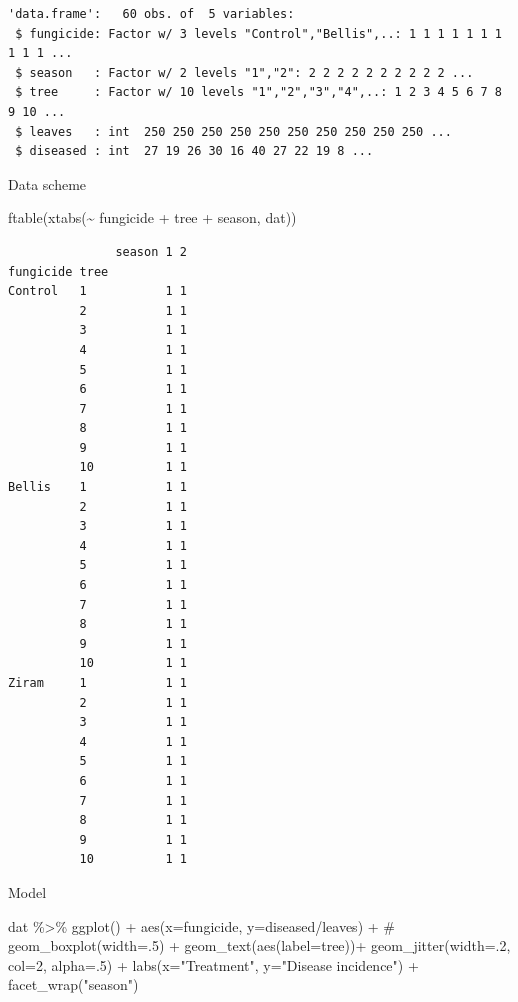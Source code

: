 \documentclass[
  letterpaper,
  DIV=11,
  numbers=noendperiod]{scrartcl}
\newenvironment{Shaded}{\begin{snugshade}}{\end{snugshade}}
\newcommand{\AttributeTok}[1]{\textcolor[rgb]{0.40,0.45,0.13}{#1}}
\newcommand{\CommentTok}[1]{\textcolor[rgb]{0.37,0.37,0.37}{#1}}
\newcommand{\DecValTok}[1]{\textcolor[rgb]{0.68,0.00,0.00}{#1}}
\newcommand{\FunctionTok}[1]{\textcolor[rgb]{0.28,0.35,0.67}{#1}}
\newcommand{\NormalTok}[1]{\textcolor[rgb]{0.00,0.23,0.31}{#1}}
\newcommand{\SpecialCharTok}[1]{\textcolor[rgb]{0.37,0.37,0.37}{#1}}
\newcommand{\StringTok}[1]{\textcolor[rgb]{0.13,0.47,0.30}{#1}}
\begin{document}
\begin{verbatim}
'data.frame':   60 obs. of  5 variables:
 $ fungicide: Factor w/ 3 levels "Control","Bellis",..: 1 1 1 1 1 1 1 1 1 1 ...
 $ season   : Factor w/ 2 levels "1","2": 2 2 2 2 2 2 2 2 2 2 ...
 $ tree     : Factor w/ 10 levels "1","2","3","4",..: 1 2 3 4 5 6 7 8 9 10 ...
 $ leaves   : int  250 250 250 250 250 250 250 250 250 250 ...
 $ diseased : int  27 19 26 30 16 40 27 22 19 8 ...
\end{verbatim}

Data scheme

\begin{Shaded}
\begin{Highlighting}[]
\FunctionTok{ftable}\NormalTok{(}\FunctionTok{xtabs}\NormalTok{(}\SpecialCharTok{\textasciitilde{}}\NormalTok{ fungicide }\SpecialCharTok{+}\NormalTok{ tree }\SpecialCharTok{+}\NormalTok{ season, dat))}
\end{Highlighting}
\end{Shaded}

\begin{verbatim}
               season 1 2
fungicide tree           
Control   1           1 1
          2           1 1
          3           1 1
          4           1 1
          5           1 1
          6           1 1
          7           1 1
          8           1 1
          9           1 1
          10          1 1
Bellis    1           1 1
          2           1 1
          3           1 1
          4           1 1
          5           1 1
          6           1 1
          7           1 1
          8           1 1
          9           1 1
          10          1 1
Ziram     1           1 1
          2           1 1
          3           1 1
          4           1 1
          5           1 1
          6           1 1
          7           1 1
          8           1 1
          9           1 1
          10          1 1
\end{verbatim}

Model

\begin{Shaded}
\begin{Highlighting}[]
\NormalTok{dat }\SpecialCharTok{\%\textgreater{}\%} 
  \FunctionTok{ggplot}\NormalTok{() }\SpecialCharTok{+} 
  \FunctionTok{aes}\NormalTok{(}\AttributeTok{x=}\NormalTok{fungicide, }\AttributeTok{y=}\NormalTok{diseased}\SpecialCharTok{/}\NormalTok{leaves) }\SpecialCharTok{+} 
  \CommentTok{\# geom\_boxplot(width=.5) + }
  \FunctionTok{geom\_text}\NormalTok{(}\FunctionTok{aes}\NormalTok{(}\AttributeTok{label=}\NormalTok{tree))}\SpecialCharTok{+}
  \FunctionTok{geom\_jitter}\NormalTok{(}\AttributeTok{width=}\NormalTok{.}\DecValTok{2}\NormalTok{, }\AttributeTok{col=}\DecValTok{2}\NormalTok{, }\AttributeTok{alpha=}\NormalTok{.}\DecValTok{5}\NormalTok{) }\SpecialCharTok{+} 
  \FunctionTok{labs}\NormalTok{(}\AttributeTok{x=}\StringTok{"Treatment"}\NormalTok{, }\AttributeTok{y=}\StringTok{"Disease incidence"}\NormalTok{) }\SpecialCharTok{+} 
  \FunctionTok{facet\_wrap}\NormalTok{(}\StringTok{"season"}\NormalTok{)}
\end{Highlighting}
\end{Shaded}
\end{document}
